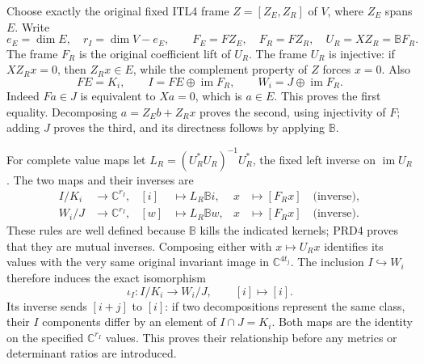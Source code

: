 \documentclass[11pt,a4paper]{article}
\begin{document}
Choose exactly the original fixed ITL4 frame $Z=[Z_E,Z_R]$ of $V$,
where $Z_E$ spans $E$. Write
\[
 e_E=\dim E,\quad r_I=\dim V-e_E,
 \qquad F_E=FZ_E,\quad F_R=FZ_R,\quad
 U_R=XZ_R=\mathbb BF_R.                                  \tag{PRD3}
\]
The frame $F_R$ is the original coefficient lift of $U_R$.
The frame $U_R$ is injective:
if $XZ_Rx=0$, then $Z_Rx\in E$, while the complement property
of $Z$ forces $x=0$. Also
\[
 F E=K_i,\qquad
 I=F E\mathbin{\oplus}\operatorname{im}F_R,
 \qquad W_i=J\mathbin{\oplus}\operatorname{im}F_R.       \tag{PRD4}
\]
Indeed $Fa\in J$ is equivalent to $Xa=0$, which is $a\in E$.
This proves the first equality. Decomposing $a=Z_Eb+Z_Rx$
proves the second, using injectivity of $F$; adding $J$ proves
the third, and its directness follows by applying $\mathbb B$.

For complete value maps let $L_R=(U_R^*U_R)^{-1}U_R^*$,
the fixed left inverse on $\operatorname{im}U_R$. The two maps
and their inverses are
\[
\begin{aligned}
 I/K_i&\longrightarrow\mathbb C^{r_I},&
 [i]&\longmapsto L_R\mathbb Bi,&
 x&\longmapsto[F_Rx]\quad\text{(inverse)},\\
 W_i/J&\longrightarrow\mathbb C^{r_I},&
 [w]&\longmapsto L_R\mathbb Bw,&
 x&\longmapsto[F_Rx]\quad\text{(inverse)}.
\end{aligned}                                                     \tag{PRD5}
\]
These rules are well defined because $\mathbb B$
kills the indicated kernels; PRD4 proves that they are mutual
inverses. Composing either with $x\mapsto U_Rx$ identifies its
values with the very same original invariant image in
$\mathbb C^{4t_j}$. The inclusion $I\hookrightarrow W_i$
therefore induces the exact isomorphism
\[
 \iota_I:I/K_i\longrightarrow W_i/J,\qquad [i]\longmapsto[i].
                                                               \tag{PRD6}
\]
Its inverse sends $[i+j]$ to $[i]$: if two decompositions represent
the same class, their $I$ components differ by an element of
$I\cap J=K_i$. Both maps are the identity on the specified
$\mathbb C^{r_I}$ values. This proves their relationship before
any metrics or determinant ratios are introduced.
\end{document}
